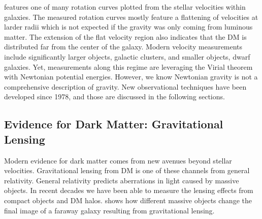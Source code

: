  features one of many rotation curves plotted from the stellar velocities within galaxies.
The measured rotation curves mostly feature a flattening of velocities at larder radii which is not expected if the gravity was only coming from luminous matter.
The extension of the flat velocity region also indicates that the DM is distributed far from the center of the galaxy.
Modern velocity measurements include significantly larger objects, galactic clusters, and smaller objects, dwarf galaxies.
Yet, measurements along this regime are leveraging the Virial theorem with Newtonian potential energies.
However, we know Newtonian gravity is not a comprehensive description of gravity.
New observational techniques have been developed since 1978, and those are discussed in the following sections.

\subsection{Evidence for Dark Matter: Gravitational Lensing\label{sec:ev4dm_lens}}

Modern evidence for dark matter comes from new avenues beyond stellar velocities.
Gravitational lensing from DM is one of these channels from general relativity.
General relativity predicts aberrations in light caused by massive objects.
In recent decades we have been able to measure the lensing effects from compact objects and DM halos.
 shows how different massive objects change the final image of a faraway galaxy resulting from gravitational lensing.

